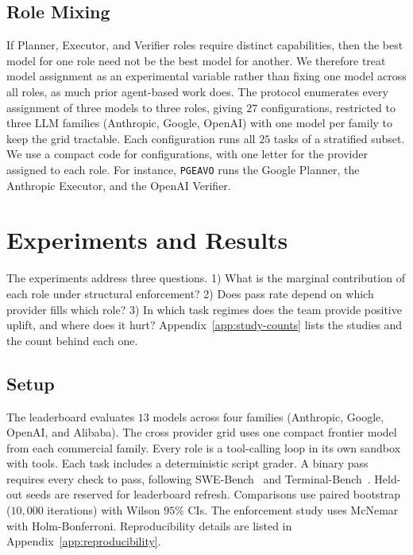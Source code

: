 \documentclass{article}
\begin{document}
\subsection{Role Mixing}
\label{sec:role-mixing}


If Planner, Executor, and Verifier roles require distinct capabilities, then the best model for one role need not be the best model for another. We therefore treat model assignment as an experimental variable rather than fixing one model across all roles, as much prior agent-based work does. The protocol enumerates every assignment of three models to three roles, giving $27$ configurations, restricted to three LLM families (Anthropic, Google, OpenAI) with one model per family to keep the grid tractable. Each configuration runs all $25$ tasks of a stratified subset. We use a compact code for configurations, with one letter for the provider assigned to each role. For instance, \texttt{PGEAVO} runs the Google Planner, the Anthropic Executor, and the OpenAI Verifier. 

\section{Experiments and Results}
\label{sec:experiment}

The experiments address three questions. 1) What is the marginal contribution of each role under structural enforcement? 2) Does pass rate depend on which provider fills which role? 3) In which task regimes does the team provide positive uplift, and where does it hurt? Appendix~\ref{app:study-counts} lists the studies and the count behind each one.

\subsection{Setup}
\label{sec:exp-studies}

The leaderboard evaluates $13$ models across four families (Anthropic, Google, OpenAI, and Alibaba). The cross provider grid uses one compact frontier model from each commercial family. Every role is a tool-calling loop in its own sandbox with tools. Each task includes a deterministic script grader. A binary pass requires every check to pass, following SWE-Bench~\citep{jimenez2024swebench} and Terminal-Bench~\citep{terminalbench2026}. Held-out seeds are reserved for leaderboard refresh. Comparisons use paired bootstrap ($10{,}000$ iterations) with Wilson $95\%$ CIs. The enforcement study uses McNemar with Holm-Bonferroni. Reproducibility details are listed in Appendix~\ref{app:reproducibility}.
\end{document}

